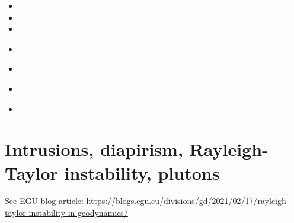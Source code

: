 \begin{small}
\begin{itemize}
\item[\nineteenninetythree] 
\item[\nineteenninetyfour] 
\item[\nineteenninetyseven] 
\item[\twothousandthree] 
\\
\item[\twothousandeleven] 
\item[\twothousandseventeen] 
\\
\item[\twothousandeighteen] 
\end{itemize}
\end{small}


























\section{Intrusions, diapirism, Rayleigh-Taylor instability, plutons}

See EGU blog article: 
\url{https://blogs.egu.eu/divisions/gd/2021/02/17/rayleigh-taylor-instability-in-geodynamics/}

